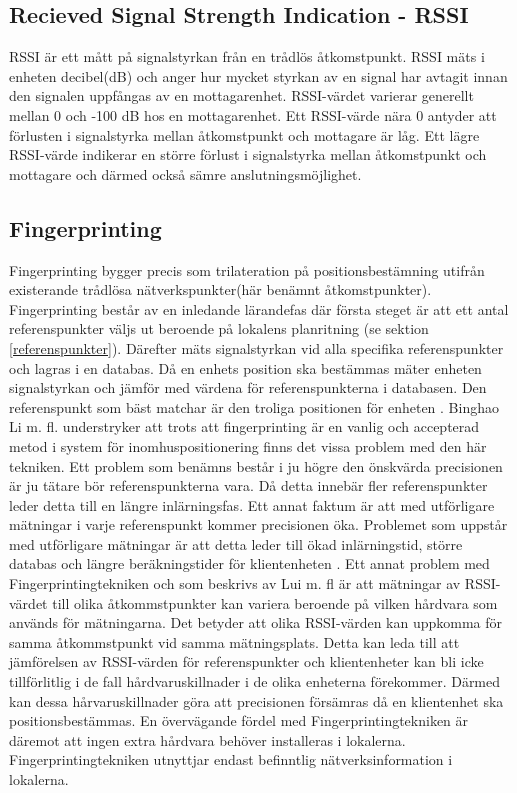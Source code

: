 \documentclass[swedish, a4paper,12pt]{article}
\begin{document}
\subsection{Recieved Signal Strength Indication - RSSI}\label{RSSI}
RSSI är ett mått på signalstyrkan från en trådlös åtkomstpunkt. RSSI mäts i enheten decibel(dB) och anger hur mycket styrkan av en signal har avtagit innan den signalen uppfångas av en mottagarenhet. RSSI-värdet varierar generellt mellan 0 och -100 dB hos en mottagarenhet. Ett RSSI-värde nära 0 antyder att förlusten i signalstyrka mellan åtkomstpunkt och mottagare är låg. Ett lägre RSSI-värde indikerar en större förlust i signalstyrka mellan åtkomstpunkt och mottagare och därmed också sämre anslutningsmöjlighet.

\subsection{Fingerprinting}\label{fingerprinting}
Fingerprinting bygger precis som trilateration på positionsbestämning utifrån existerande trådlösa nätverkspunkter(här benämnt åtkomstpunkter). Fingerprinting består av en inledande lärandefas där första steget är att ett antal referenspunkter väljs ut beroende på lokalens planritning (se sektion \ref{referenspunkter}). Därefter mäts signalstyrkan vid alla specifika referenspunkter och lagras i en databas. %
Då en enhets position ska bestämmas mäter enheten signalstyrkan och jämför med värdena för referenspunkterna i databasen. Den referenspunkt som bäst matchar är den troliga positionen för enheten \cite{IP1}\cite{jun2018low}.
Binghao Li m. fl. understryker att trots att fingerprinting är en vanlig och accepterad metod i system för inomhuspositionering finns det vissa problem med den här tekniken\cite{IP1}.
Ett problem som benämns består i ju högre den önskvärda precisionen är ju tätare bör referenspunkterna vara. Då detta innebär fler referenspunkter leder detta till en längre inlärningsfas. Ett annat faktum är att med utförligare mätningar i varje referenspunkt kommer precisionen öka. Problemet som uppstår med utförligare mätningar är att detta leder till ökad inlärningstid, större databas och längre beräkningstider för klientenheten \cite{IP1}. Ett annat problem med Fingerprintingtekniken och som beskrivs av Lui m. fl \cite{problem_with_RSSI} är att mätningar av RSSI-värdet till olika åtkommstpunkter kan variera beroende på vilken hårdvara som används för mätningarna. Det betyder att olika RSSI-värden kan uppkomma för samma åtkommstpunkt vid samma mätningsplats. Detta kan leda till att jämförelsen av RSSI-värden för referenspunkter och klientenheter kan bli icke tillförlitlig i de fall hårdvaruskillnader i de olika enheterna förekommer. Därmed kan dessa hårvaruskillnader göra att precisionen försämras då en klientenhet ska positionsbestämmas\cite{problem_with_RSSI}. En övervägande fördel med Fingerprintingtekniken är däremot att ingen extra hårdvara behöver installeras i lokalerna. Fingerprintingtekniken utnyttjar endast befinntlig nätverksinformation i lokalerna.
\end{document}
